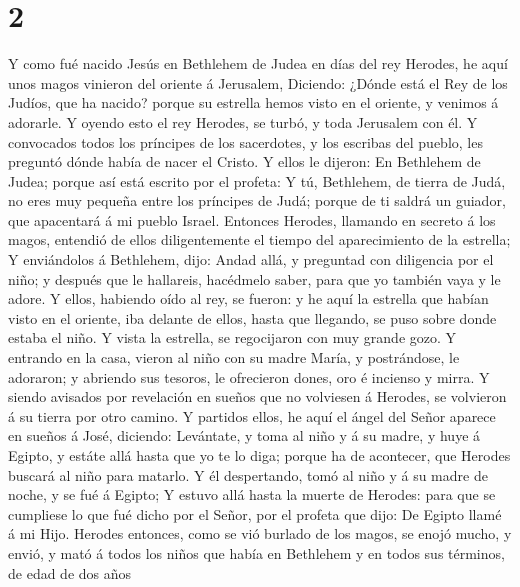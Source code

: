 \hypertarget{section-1}{%
\section{2}\label{section-1}}

 Y como fué nacido Jesús en Bethlehem de Judea en días del
rey Herodes, he aquí unos magos vinieron del oriente á Jerusalem,
 Diciendo: ¿Dónde está el Rey de los Judíos, que ha
nacido? porque su estrella hemos visto en el oriente, y venimos á
adorarle.  Y oyendo esto el rey Herodes, se turbó, y toda
Jerusalem con él.  Y convocados todos los príncipes de los
sacerdotes, y los escribas del pueblo, les preguntó dónde había de nacer
el Cristo.  Y ellos le dijeron: En Bethlehem de Judea;
porque así está escrito por el profeta:  Y tú, Bethlehem,
de tierra de Judá, no eres muy pequeña entre los príncipes de Judá;
porque de ti saldrá un guiador, que apacentará á mi pueblo Israel.
 Entonces Herodes, llamando en secreto á los magos,
entendió de ellos diligentemente el tiempo del aparecimiento de la
estrella;  Y enviándolos á Bethlehem, dijo: Andad allá, y
preguntad con diligencia por el niño; y después que le hallareis,
hacédmelo saber, para que yo también vaya y le adore.  Y
ellos, habiendo oído al rey, se fueron: y he aquí la estrella que habían
visto en el oriente, iba delante de ellos, hasta que llegando, se puso
sobre donde estaba el niño.  Y vista la estrella, se
regocijaron con muy grande gozo.  Y entrando en la casa,
vieron al niño con su madre María, y postrándose, le adoraron; y
abriendo sus tesoros, le ofrecieron dones, oro é incienso y mirra.
 Y siendo avisados por revelación en sueños que no
volviesen á Herodes, se volvieron á su tierra por otro camino.
 Y partidos ellos, he aquí el ángel del Señor aparece en
sueños á José, diciendo: Levántate, y toma al niño y á su madre, y huye
á Egipto, y estáte allá hasta que yo te lo diga; porque ha de acontecer,
que Herodes buscará al niño para matarlo.  Y él
despertando, tomó al niño y á su madre de noche, y se fué á Egipto;
 Y estuvo allá hasta la muerte de Herodes: para que se
cumpliese lo que fué dicho por el Señor, por el profeta que dijo: De
Egipto llamé á mi Hijo.  Herodes entonces, como se vió
burlado de los magos, se enojó mucho, y envió, y mató á todos los niños
que había en Bethlehem y en todos sus términos, de edad de dos años
